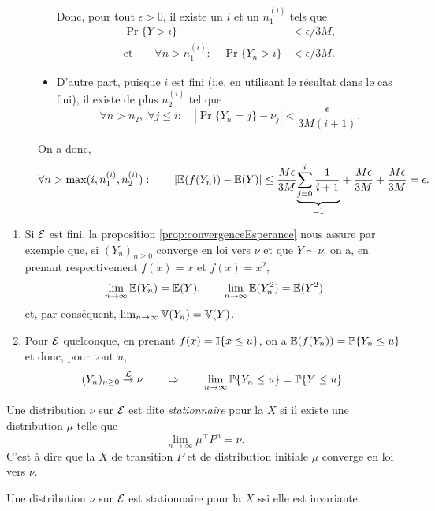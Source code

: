 \begin{description}
\begin{itemize}
  Donc, pour tout $\epsilon > 0$, il existe un $i$ et un $n_1^{(i)}$ tels que 
  \begin{align*}
  \Pr\{Y > i\} & < \epsilon / 3M, \\
  \text{et} \qquad 
  \forall n > n_1^{(i)}: \quad \Pr\{Y_n > i\} & < \epsilon / 3M.
  \end{align*}
  \item D'autre part, puisque $i$ est fini (i.e. en utilisant le résultat dans le cas fini), il existe de plus $n_2^{(i)}$ tel que 
  $$
  \forall n > n_2, \; \forall j \leq i: \quad \left|\Pr\{Y_n=j\} - \nu_j\right| < \frac\epsilon{3M(i+1)}.
  $$
  \end{itemize}
  On a donc, 
 \begin{align*}
   \forall n > \max(i, n_1^{(i)}, n_2^{(i)}): \qquad 
   \left|\operatorname{\mathbb{E}}(f(Y_n)) - \operatorname{\mathbb{E}}(Y)\right| \leq \frac{M\epsilon}{3M} \underset{=1}{\underbrace{\sum_{j=0}^i \frac1{i+1}}} + \frac{M\epsilon}{3M} + \frac{M\epsilon}{3M} = \epsilon.
  \end{align*}
\end{description}
\eproof

\remarks
\begin{enumerate}
\item Si $\mathcal{E}$ est fini, la proposition \ref{prop:convergenceEsperance} nous assure par exemple que, si $(Y_n)_{n \geq 0}$ converge en loi vers $\nu$ et que $Y \sim \nu$, on a, en prenant respectivement $f(x) = x$ et $f(x) = x^2$, 
$$
\lim_{n \to \infty} \operatorname{\mathbb{E}}(Y_n) = \operatorname{\mathbb{E}}(Y), \qquad
\lim_{n \to \infty} \operatorname{\mathbb{E}}(Y_n^2) = \operatorname{\mathbb{E}}(Y^2)
$$
et, par conséquent, $\lim_{n \to \infty} \operatorname{\mathbb{V}}(Y_n) = \operatorname{\mathbb{V}}(Y)$. 
\item Pour $\mathcal{E}$ quelconque, en prenant $f(x) = \mathbb{I}\{x \leq u\}$, on a $\operatorname{\mathbb{E}}(f(Y_n)) = \operatorname{\mathbb{P}}\{Y_n \leq u\}$ et donc, pour tout $u$, 
$$
(Y_n)_{n \geq 0} \overset{\mathcal{L}}{\rightarrow} \nu
\qquad \Rightarrow \qquad
\lim_{n \to \infty} \operatorname{\mathbb{P}}\{Y_n \leq u\} = \operatorname{\mathbb{P}}\{Y \leq u\}.
$$
\end{enumerate}

\begin{definition}
  Une distribution $\nu$ sur $\mathcal{E}$ est dite \emph{stationnaire} pour la \cM $X$ si il existe une distribution $\mu$ telle que 
  $$
  \lim_{n \to \infty} \mu^\top P^n = \nu.
  $$
  C'est à dire que la \cM $X$ de transition $P$ et de distribution initiale $\mu$ converge en loi vers $\nu$.
\end{definition}

\begin{proposition} \label{prop:stationnaireInvariante}
  Une distribution $\nu$ sur $\mathcal{E}$ est stationnaire pour la \cM $X$ ssi elle est invariante.
\end{proposition}

